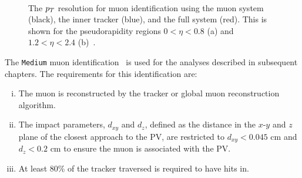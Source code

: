 \begin{figure}[t]
\centering
     \\
\caption[Plots of the muon identification performance.]{The $p_{T}$ resolution for muon identification using the muon system (black), the inner tracker (blue), and the full system (red). This is shown for the pseudorapidity regions $0 < \eta < 0.8$ (a) and  $1.2 < \eta < 2.4$ (b)~\cite{CMS_Setup}.}
\label{fig:muon_eff}
\end{figure}

The \texttt{Medium} muon identification~\cite{CMS:2018rym} is used for the analyses described in subsequent chapters.
The requirements for this identification are:
\begin{enumerate}[i)]
\item The muon is reconstructed by the tracker or global muon reconstruction algorithm.
\item The impact parameters, $d_{xy}$ and $d_{z}$, defined as the distance in the $x$-$y$ and $z$ plane of the closest approach to the \ac{PV}, are restricted to $d_{xy}<0.045$ cm and $d_{z}<0.2$ cm to ensure the muon is associated with the \ac{PV}.
\item At least 80\% of the tracker traversed is required to have hits in.
\end{enumerate}

